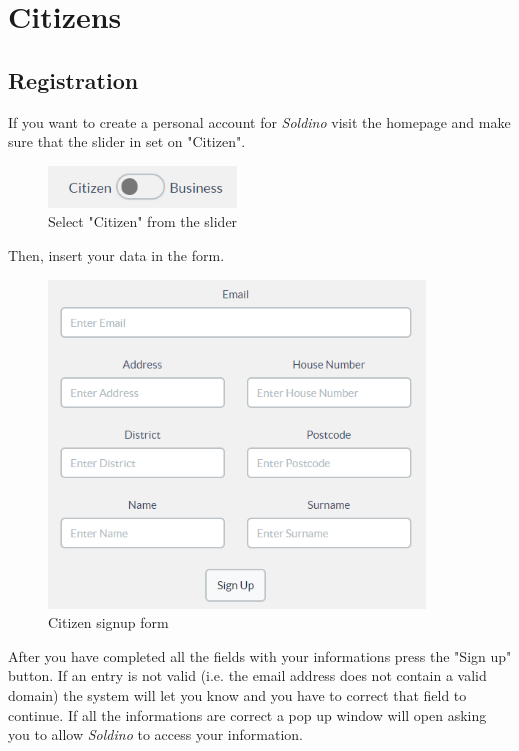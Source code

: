 \section{Citizens}
	\subsection{Registration}
	If you want to create a personal account for \textit{Soldino} visit the
	homepage and make sure that the slider in set on "Citizen".\\
	\begin{figure}[H]
		\includegraphics[width=5cm]{res/images/user_citizen.png}
		\centering
		\caption{Select "Citizen" from the slider}
	\end{figure}	
	\noindent Then, insert your data in the form. 
	\begin{figure}[H]
		\includegraphics[width=10cm]{res/images/citizen_signup.png}
		\centering
		\caption{Citizen signup form}
	\end{figure}
	\noindent After you have completed all the
	fields with your informations press the "Sign up" button. If an entry 
	is not valid (i.e. the email address does not contain a valid domain) 
	the system will let you know and you have to correct that field to continue.
	If all the informations are correct a pop up window will open asking you 
	to allow \textit{Soldino} to access your information.\\
